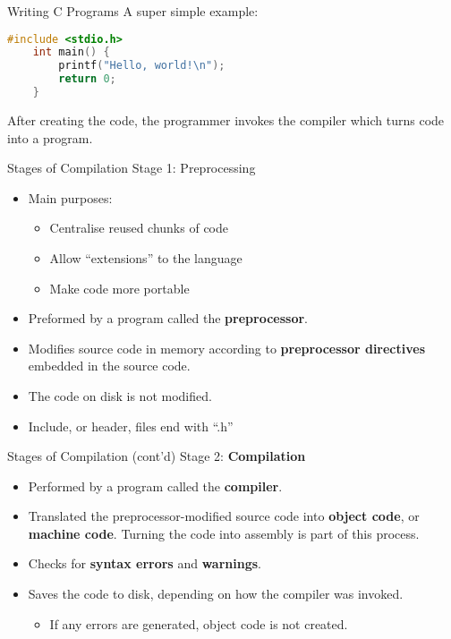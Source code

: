 \documentclass[graphics]{beamer}
\begin{document}
\begin{frame}[fragile]{Writing C Programs}
    A super simple example:
    \begin{lstlisting}[language=c,showspaces=false,keywordstyle=\color{magenta},stringstyle=\color{purple},basicstyle=\ttfamily\footnotesize,numberstyle=\tiny\color{codegray},commentstyle=\color{green},]
    #include <stdio.h>
    int main() {
        printf("Hello, world!\n");
        return 0;
    }
    \end{lstlisting}
    After creating the code, the programmer invokes the compiler which turns code into a program.
\end{frame}

\begin{frame}{Stages of Compilation}
    Stage 1: Preprocessing
    \begin{itemize}
        \item Main purposes:
        \begin{itemize}
            \item Centralise reused chunks of code
            \item Allow ``extensions'' to the language
            \item Make code more portable
        \end{itemize}
        \item Preformed by a program called the \textbf{preprocessor}.
        \item Modifies source code in memory according to \textbf{preprocessor directives} embedded in the source code.
        \item The code on disk is not modified.
        \item Include, or header, files end with ``.h'' 
    \end{itemize}
\end{frame}

\begin{frame}{Stages of Compilation (cont'd)}
    Stage 2: \textbf{Compilation}
    \begin{itemize}
        \item Performed by a program called the \textbf{compiler}.
        \item Translated the preprocessor-modified source code into \textbf{object code}, or \textbf{machine code}. Turning the code into assembly is part of this process.
        \item Checks for \textbf{syntax errors} and \textbf{warnings}.
        \item Saves the code to disk, depending on how the compiler was invoked.
        \begin{itemize}
            \item If any errors are generated, object code is not created.
        \end{itemize}
    \end{itemize}
\end{frame}
\end{document}
